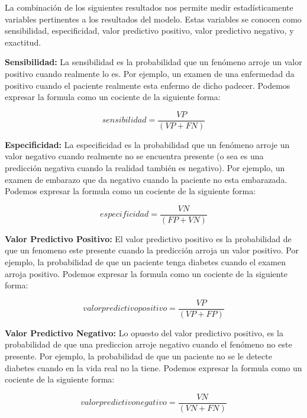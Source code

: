 \documentclass[letterpaper, spanish, 11pt]{report}
\begin{document}
La combinación de los siguientes resultados nos permite medir estadísticamente variables pertinentes a los resultados del modelo. Estas variables se conocen como sensibilidad, especificidad, valor predictivo positivo, valor predictivo negativo, y exactitud.

\textbf{Sensibilidad:} La sensibilidad es la probabilidad que un fenómeno arroje un valor positivo cuando realmente lo es. Por ejemplo, un examen de una enfermedad da positivo cuando el paciente realmente esta enfermo de dicho padecer. Podemos expresar la formula como un cociente de la siguiente forma:

\begin{equation}
sensibilidad = \frac{VP}{(VP + FN)}
\end{equation}

\textbf{Especificidad:} La especificidad es la probabilidad que un fenómeno arroje un valor negativo cuando realmente no se encuentra presente (o sea es una predicción negativa cuando la realidad también es negativo). Por ejemplo, un examen de embarazo que da negativo cuando la paciente no esta embarazada. Podemos expresar la formula como un cociente de la siguiente forma:

\begin{equation}
especificidad= \frac{VN}{(FP + VN)}
\end{equation}

\textbf{Valor Predictivo Positivo:} El valor predictivo positivo es la probabilidad de que un fenomeno este presente cuando la predicción arroja un valor positivo. Por ejemplo, la probabilidad de que un paciente tenga diabetes cuando el examen arroja positivo. Podemos expresar la formula como un cociente de la siguiente forma:

\begin{equation}
valor predictivo positivo = \frac{VP}{(VP + FP)}
\end{equation}

\textbf{Valor Predictivo Negativo:} Lo opuesto del valor predictivo positivo, es la probabilidad de que una prediccion arroje negativo cuando el fenómeno no este presente. Por ejemplo, la probabilidad de que un paciente no se le detecte diabetes cuando en la vida real no la tiene. Podemos expresar la formula como un cociente de la siguiente forma:

\begin{equation}
valor predictivo negativo = \frac{VN}{(VN + FN)}
\end{equation}
\end{document}
